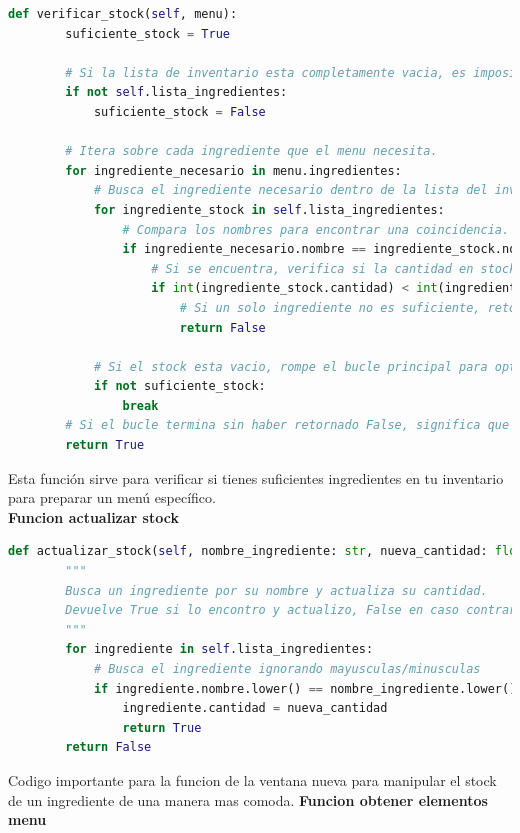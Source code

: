 \documentclass[a4paper,12pt]{article}
\begin{document}
\begin{lstlisting}[language=Python, caption={Cambio de codigo}, frame=single]
def verificar_stock(self, menu):
        suficiente_stock = True
    
        # Si la lista de inventario esta completamente vacia, es imposible preparar algo.
        if not self.lista_ingredientes:
            suficiente_stock = False

        # Itera sobre cada ingrediente que el menu necesita.
        for ingrediente_necesario in menu.ingredientes:
            # Busca el ingrediente necesario dentro de la lista del inventario.
            for ingrediente_stock in self.lista_ingredientes:
                # Compara los nombres para encontrar una coincidencia.
                if ingrediente_necesario.nombre == ingrediente_stock.nombre:
                    # Si se encuentra, verifica si la cantidad en stock es menor a la requerida.
                    if int(ingrediente_stock.cantidad) < int(ingrediente_necesario.cantidad):
                        # Si un solo ingrediente no es suficiente, retorna False inmediatamente.
                        return False
        
            # Si el stock esta vacio, rompe el bucle principal para optimizar.
            if not suficiente_stock:
                break
        # Si el bucle termina sin haber retornado False, significa que todos los ingredientes estan disponibles.
        return True
\end{lstlisting}
Esta función sirve para verificar si tienes suficientes ingredientes en tu inventario para preparar un menú específico.\\
\textbf{Funcion actualizar stock}
\begin{lstlisting}[language=Python, caption={Cambio de codigo}, frame=single]
    def actualizar_stock(self, nombre_ingrediente: str, nueva_cantidad: float):
        """
        Busca un ingrediente por su nombre y actualiza su cantidad.
        Devuelve True si lo encontro y actualizo, False en caso contrario.
        """
        for ingrediente in self.lista_ingredientes:
            # Busca el ingrediente ignorando mayusculas/minusculas
            if ingrediente.nombre.lower() == nombre_ingrediente.lower():
                ingrediente.cantidad = nueva_cantidad
                return True  
        return False 
\end{lstlisting}
Codigo importante para la funcion de la ventana nueva para manipular el stock de un ingrediente de una manera mas comoda.
\newpage
\textbf{Funcion obtener elementos menu}
\end{document}
